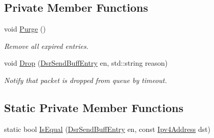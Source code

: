 \subsection*{Private Member Functions}
\begin{DoxyCompactItemize}
\item 
void \hyperlink{classns3_1_1dsr_1_1DsrSendBuffer_a4fc2bdaf29505ff9ec26f75b2e387e29}{Purge} ()
\begin{DoxyCompactList}\small\item\em Remove all expired entries. \end{DoxyCompactList}\item 
void \hyperlink{classns3_1_1dsr_1_1DsrSendBuffer_ae076b4ebb909c5dc7deda45d905b8e97}{Drop} (\hyperlink{classns3_1_1dsr_1_1DsrSendBuffEntry}{Dsr\+Send\+Buff\+Entry} en, std\+::string reason)
\begin{DoxyCompactList}\small\item\em Notify that packet is dropped from queue by timeout. \end{DoxyCompactList}\end{DoxyCompactItemize}
\subsection*{Static Private Member Functions}
\begin{DoxyCompactItemize}
\item 
static bool \hyperlink{classns3_1_1dsr_1_1DsrSendBuffer_aa087dc663e99a56ecf337cd43d5e4df4}{Is\+Equal} (\hyperlink{classns3_1_1dsr_1_1DsrSendBuffEntry}{Dsr\+Send\+Buff\+Entry} en, const \hyperlink{classns3_1_1Ipv4Address}{Ipv4\+Address} dst)
\end{DoxyCompactItemize}
